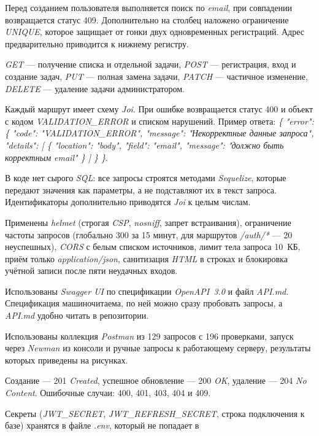 \documentclass{stp}
\newcommand{\en}[1]{\textit{#1}}
\begin{document}
\begin{stpnum}
  \item Перед созданием пользователя выполняется поиск по \en{email}, при
    совпадении возвращается статус 409. Дополнительно на столбец
    наложено ограничение \en{UNIQUE}, которое защищает от гонки двух
    одновременных регистраций. Адрес предварительно приводится к нижнему
    регистру.
  \item \en{GET} --- получение списка и отдельной задачи, \en{POST} ---
    регистрация, вход и создание задач, \en{PUT} --- полная замена задачи,
    \en{PATCH} --- частичное изменение, \en{DELETE} --- удаление задачи
    администратором.
  \item Каждый маршрут имеет схему \en{Joi}. При ошибке возвращается
    статус 400 и объект с кодом \en{VALIDATION\_ERROR} и списком
    нарушений. Пример ответа:
    \en{\{ "error": \{ "code": "VALIDATION\_ERROR", "message":
    "Некорректные данные запроса", "details": [ \{ "location": "body",
    "field": "email", "message": "должно быть корректным email" \} ] \}
    \}}.
  \item В коде нет сырого \en{SQL}: все запросы строятся методами
    \en{Sequelize}, которые передают значения как параметры, а не
    подставляют их в текст запроса. Идентификаторы дополнительно
    приводятся \en{Joi} к целым числам.
  \item Применены \en{helmet} (строгая \en{CSP}, \en{nosniff}, запрет
    встраивания), ограничение частоты запросов (глобально 300 за 15 минут,
    для маршрутов \en{/auth/*} --- 20 неуспешных), \en{CORS} с белым
    списком источников, лимит тела запроса 10~КБ, приём только
    \en{application/json}, санитизация \en{HTML} в строках и блокировка
    учётной записи после пяти неудачных входов.
  \item Использованы \en{Swagger UI} по спецификации \en{OpenAPI~3.0} и
    файл \en{API.md}. Спецификация машиночитаема, по ней можно сразу
    пробовать запросы, а \en{API.md} удобно читать в репозитории.
  \item Использованы коллекция \en{Postman} из 129 запросов с 196
    проверками, запуск через \en{Newman} из консоли и ручные запросы к
    работающему серверу, результаты которых приведены на рисунках.
  \item Создание --- 201 \en{Created}, успешное обновление --- 200
    \en{OK}, удаление --- 204 \en{No Content}. Ошибочные случаи: 400, 401,
    403, 404 и 409.
  \item Секреты (\en{JWT\_SECRET}, \en{JWT\_REFRESH\_SECRET}, строка
    подключения к базе) хранятся в файле \en{.env}, который не попадает в

\end{stpnum}
\end{document}
